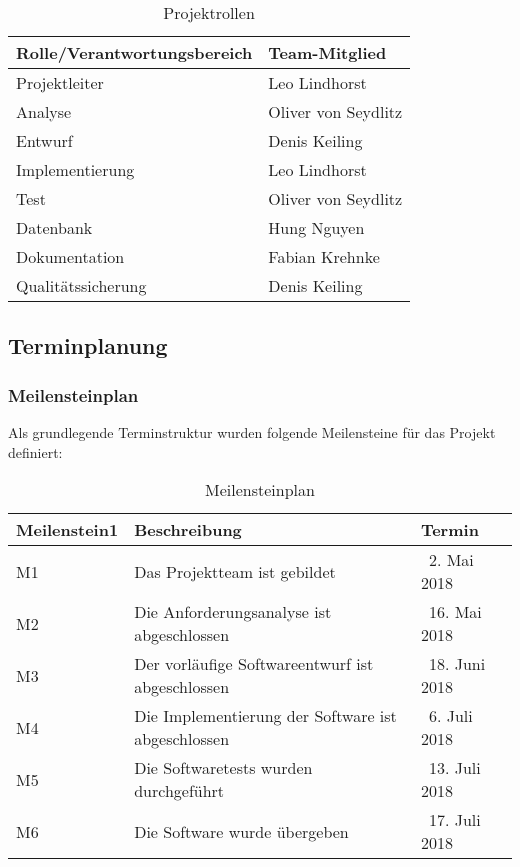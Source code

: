 \begin{table}[h]
	\begin{tabular}{l|l}
	Rolle/Verantwortungsbereich & Team-Mitglied \\
	\hline
	Projektleiter & Leo Lindhorst \\
	\hline
	Analyse & Oliver von Seydlitz \\
	\hline
	Entwurf & Denis Keiling \\
	\hline
	Implementierung & Leo Lindhorst \\
	\hline
	Test & Oliver von Seydlitz \\
	\hline
	Datenbank & Hung Nguyen \\
	\hline
	Dokumentation & Fabian Krehnke \\
	\hline
	Qualitätssicherung & Denis Keiling \\
	\hline
	\end{tabular}
	\caption{Projektrollen}
	\label{tab:Projektrollen}
\end{table}

\subsection{Terminplanung}
\subsubsection{Meilensteinplan}
Als grundlegende Terminstruktur wurden folgende Meilensteine für das Projekt definiert:

\begin{table}[h]
	\begin{tabular}{l|l|l}
	Meilenstein1 & Beschreibung & Termin \\
	\hline
	M1 & Das Projektteam ist gebildet & 2. Mai 2018 \\
	\hline
	M2 & Die Anforderungsanalyse ist abgeschlossen & 16. Mai 2018 \\
	\hline
	M3 & Der vorläufige Softwareentwurf ist abgeschlossen & 18. Juni 2018 \\
	\hline
	M4 & Die Implementierung der Software ist abgeschlossen & 6. Juli 2018 \\
	\hline
	M5 & Die Softwaretests wurden durchgeführt & 13. Juli 2018 \\
	\hline
	M6 & Die Software wurde übergeben & 17. Juli 2018 \\
	\hline
	\end{tabular}
	\caption{Meilensteinplan}
	\label{tab:Meilensteinplan}
\end{table}

